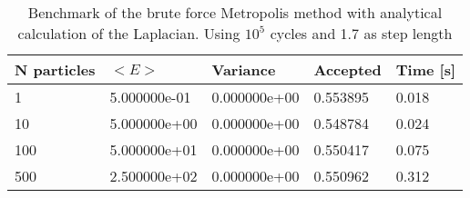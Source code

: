 \begin{table}[h!]
\centering 
\begin{tabular}{|l|l|l|l|l|}
\hline 
N particles & $<E>$ & Variance & Accepted & Time [s]\\ 
 \hline 
1 & 5.000000e-01 & 0.000000e+00 & 0.553895 & 0.018 \\ \hline 
10 & 5.000000e+00 & 0.000000e+00 & 0.548784 & 0.024 \\ \hline 
100 & 5.000000e+01 & 0.000000e+00 & 0.550417 & 0.075 \\ \hline 
500 & 2.500000e+02 & 0.000000e+00 & 0.550962 & 0.312 \\ \hline 
\end{tabular}
\caption{%
	  Benchmark of the brute force Metropolis method with %
	  analytical calculation of the Laplacian. Using $10^5$ %
	  cycles and 1.7 as step length%
	}
\label{tab:ha1} 
\end{table} 
